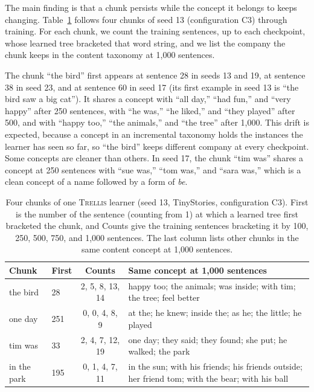 \documentclass[11pt,letterpaper]{article}
\newcommand{\trellis}{\textsc{Trellis}}
\begin{document}
The main finding is that a chunk persists while the concept it belongs to keeps changing. Table~\ref{tab:bio} follows four chunks of seed 13 (configuration C3) through training.
For each chunk, we count the training sentences, up to each checkpoint, whose learned tree bracketed that word string, and we list the company the chunk keeps in the content taxonomy at 1,000 sentences.

The chunk ``the bird'' first appears at sentence 28 in seeds 13 and 19, at sentence 38 in seed 23, and at sentence 60 in seed 17 (its first example in seed 13 is ``the bird saw a big cat'').
It shares a concept with ``all day,'' ``had fun,'' and ``very happy'' after 250 sentences, with ``he was,'' ``he liked,'' and ``they played'' after 500, and with ``happy too,'' ``the animals,'' and ``the tree'' after 1,000.
This drift is expected, because a concept in an incremental taxonomy holds the instances the learner has seen so far, so ``the bird'' keeps different company at every checkpoint.
Some concepts are cleaner than others. In seed 17, the chunk ``tim was'' shares a concept at 250 sentences with ``sue was,'' ``tom was,'' and ``sara was,'' which is a clean concept of a name followed by a form of \textit{be}.

\begin{table}[!htbp]
\caption{Four chunks of one \trellis{} learner (seed 13, TinyStories, configuration C3). First is the number of the sentence (counting from 1) at which a learned tree first bracketed the chunk, and Counts give the training sentences bracketing it by 100, 250, 500, 750, and 1,000 sentences.
The last column lists other chunks in the same content concept at 1,000 sentences.}
\label{tab:bio}
\begin{center}
\footnotesize
\begin{tabular}{llcp{}}
\toprule
Chunk & First & Counts & Same concept at 1,000 sentences \\
\midrule
the bird & 28 & 2, 5, 8, 13, 14 & happy too; the animals; was inside; with tim; the tree; feel better \\
one day & 251 & 0, 0, 4, 8, 9 & at the; he knew; inside the; as he; the little; he played \\
tim was & 33 & 2, 4, 7, 12, 19 & one day; they said; they found; she put; he walked; the park \\
in the park & 195 & 0, 1, 4, 7, 11 & in the sun; with his friends; his friends outside; her friend tom; with the bear; with his ball \\
\bottomrule
\end{tabular}
\end{center}
\end{table}
\end{document}
